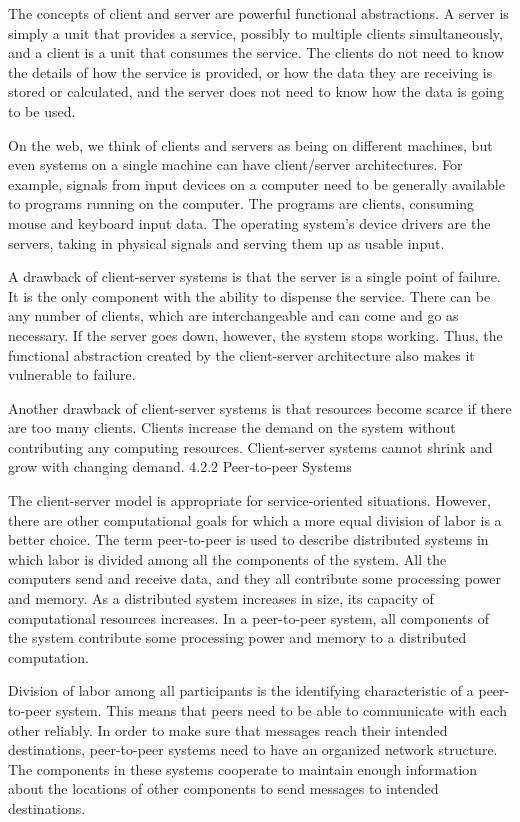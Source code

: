 \documentclass[letterpaper,10pt,dvipdfmx]{sphinxmanual}
\begin{document}
The concepts of client and server are powerful functional abstractions. A server is simply a unit that provides a service, possibly to multiple clients simultaneously, and a client is a unit that consumes the service. The clients do not need to know the details of how the service is provided, or how the data they are receiving is stored or calculated, and the server does not need to know how the data is going to be used.

On the web, we think of clients and servers as being on different machines, but even systems on a single machine can have client/server architectures. For example, signals from input devices on a computer need to be generally available to programs running on the computer. The programs are clients, consuming mouse and keyboard input data. The operating system's device drivers are the servers, taking in physical signals and serving them up as usable input.

A drawback of client-server systems is that the server is a single point of failure. It is the only component with the ability to dispense the service. There can be any number of clients, which are interchangeable and can come and go as necessary. If the server goes down, however, the system stops working. Thus, the functional abstraction created by the client-server architecture also makes it vulnerable to failure.

Another drawback of client-server systems is that resources become scarce if there are too many clients. Clients increase the demand on the system without contributing any computing resources. Client-server systems cannot shrink and grow with changing demand.
4.2.2   Peer-to-peer Systems

The client-server model is appropriate for service-oriented situations. However, there are other computational goals for which a more equal division of labor is a better choice. The term peer-to-peer is used to describe distributed systems in which labor is divided among all the components of the system. All the computers send and receive data, and they all contribute some processing power and memory. As a distributed system increases in size, its capacity of computational resources increases. In a peer-to-peer system, all components of the system contribute some processing power and memory to a distributed computation.

Division of labor among all participants is the identifying characteristic of a peer-to-peer system. This means that peers need to be able to communicate with each other reliably. In order to make sure that messages reach their intended destinations, peer-to-peer systems need to have an organized network structure. The components in these systems cooperate to maintain enough information about the locations of other components to send messages to intended destinations.
\end{document}
